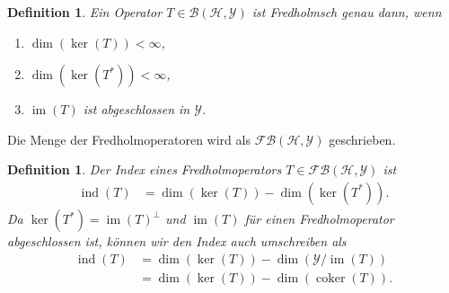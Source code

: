 \documentclass[11pt, hidelinks]{article}
\newcommand{\h}{\mathcal{H}}
\newcommand{\ind}{\operatorname{ind}}
\newcommand{\im}{\operatorname{im}}
\newcommand{\coker}{\operatorname{coker}}
\numberwithin{conj}{section}
\newtheorem{definition}[conj]{Definition}
\begin{document}
\begin{definition}
    Ein Operator $T \in \mathcal{B}(\h,\mathcal{Y})$ ist Fredholmsch genau dann, wenn
    \begin{enumerate}
        \item $\dim(\ker(T)) < \infty$,
        \item $\dim(\ker(T^\ast)) < \infty$,
        \item $\im(T)$ ist abgeschlossen in $\mathcal{Y}$.
    \end{enumerate}
\end{definition}

Die Menge der Fredholmoperatoren wird als $\mathcal{FB}(\h,\mathcal{Y})$ geschrieben.

\begin{definition}
    Der Index eines Fredholmoperators $T \in \mathcal{FB}(\h,\mathcal{Y})$ ist
    \begin{align}
        \ind(T) &= \dim(\ker(T)) - \dim(\ker(T^\ast)).
    \end{align}
    Da $\ker(T^\ast) = \im(T)^\perp$ und $\im(T)$ für einen Fredholmoperator abgeschlossen ist, können wir den Index auch umschreiben als
    \begin{align}
        \ind(T) &= \dim(\ker(T)) - \dim(\mathcal{Y}/\im(T)) \nonumber\\
                &= \dim(\ker(T)) - \dim(\coker(T)).
    \end{align}
\end{definition}
\end{document}
